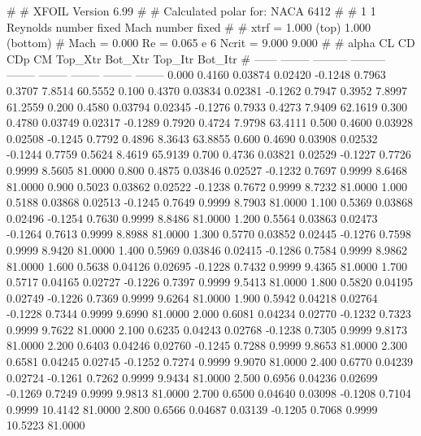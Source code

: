 #  
#       XFOIL         Version 6.99
#  
# Calculated polar for: NACA 6412                                       
#  
# 1 1 Reynolds number fixed          Mach number fixed         
#  
# xtrf =   1.000 (top)        1.000 (bottom)  
# Mach =   0.000     Re =     0.065 e 6     Ncrit =   9.000  9.000
#  
#   alpha    CL        CD       CDp       CM     Top_Xtr  Bot_Xtr  Top_Itr  Bot_Itr
#  ------ -------- --------- --------- -------- -------- -------- -------- --------
   0.000   0.4160   0.03874   0.02420  -0.1248   0.7963   0.3707   7.8514  60.5552
   0.100   0.4370   0.03834   0.02381  -0.1262   0.7947   0.3952   7.8997  61.2559
   0.200   0.4580   0.03794   0.02345  -0.1276   0.7933   0.4273   7.9409  62.1619
   0.300   0.4780   0.03749   0.02317  -0.1289   0.7920   0.4724   7.9798  63.4111
   0.500   0.4600   0.03928   0.02508  -0.1245   0.7792   0.4896   8.3643  63.8855
   0.600   0.4690   0.03908   0.02532  -0.1244   0.7759   0.5624   8.4619  65.9139
   0.700   0.4736   0.03821   0.02529  -0.1227   0.7726   0.9999   8.5605  81.0000
   0.800   0.4875   0.03846   0.02527  -0.1232   0.7697   0.9999   8.6468  81.0000
   0.900   0.5023   0.03862   0.02522  -0.1238   0.7672   0.9999   8.7232  81.0000
   1.000   0.5188   0.03868   0.02513  -0.1245   0.7649   0.9999   8.7903  81.0000
   1.100   0.5369   0.03868   0.02496  -0.1254   0.7630   0.9999   8.8486  81.0000
   1.200   0.5564   0.03863   0.02473  -0.1264   0.7613   0.9999   8.8988  81.0000
   1.300   0.5770   0.03852   0.02445  -0.1276   0.7598   0.9999   8.9420  81.0000
   1.400   0.5969   0.03846   0.02415  -0.1286   0.7584   0.9999   8.9862  81.0000
   1.600   0.5638   0.04126   0.02695  -0.1228   0.7432   0.9999   9.4365  81.0000
   1.700   0.5717   0.04165   0.02727  -0.1226   0.7397   0.9999   9.5413  81.0000
   1.800   0.5820   0.04195   0.02749  -0.1226   0.7369   0.9999   9.6264  81.0000
   1.900   0.5942   0.04218   0.02764  -0.1228   0.7344   0.9999   9.6990  81.0000
   2.000   0.6081   0.04234   0.02770  -0.1232   0.7323   0.9999   9.7622  81.0000
   2.100   0.6235   0.04243   0.02768  -0.1238   0.7305   0.9999   9.8173  81.0000
   2.200   0.6403   0.04246   0.02760  -0.1245   0.7288   0.9999   9.8653  81.0000
   2.300   0.6581   0.04245   0.02745  -0.1252   0.7274   0.9999   9.9070  81.0000
   2.400   0.6770   0.04239   0.02724  -0.1261   0.7262   0.9999   9.9434  81.0000
   2.500   0.6956   0.04236   0.02699  -0.1269   0.7249   0.9999   9.9813  81.0000
   2.700   0.6500   0.04640   0.03098  -0.1208   0.7104   0.9999  10.4142  81.0000
   2.800   0.6566   0.04687   0.03139  -0.1205   0.7068   0.9999  10.5223  81.0000

